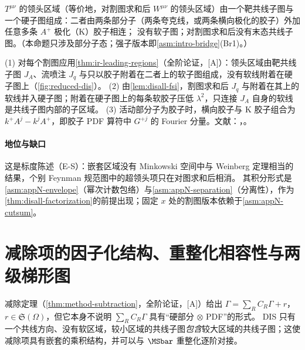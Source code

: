 \begin{proposition}\label{prop:disall-regions}
$T^{\mu\nu}$ 的领头区域（等价地，对割图求和后 $W^{\mu\nu}$ 的领头区域）由一个靶共线子图与一个硬子图组成：二者由两条部分子（两条夸克线，或两条横向极化的胶子）外加任意多条 $A^+$ 极化（K）胶子相连；
没有软子图；对割图求和后没有末态共线子图。（本命题只涉及部分子态；强子版本即\cref{asm:intro-bridge}(Br1)。）
\end{proposition}

\begin{proofsketch}
(1) 对每个割图应用\cref{thm:ir-leading-regions}（全阶论证，[A]）：领头区域由靶共线子图 $J_A$、流喷注 $J_q$ 与只以胶子附着在二者上的软子图组成，没有软线附着在硬子图上（\cref{fig:reduced-dis}）。
(2) 由\cref{lem:disall-fsi}，割图求和后 $J_q$ 与附着在其上的软线并入硬子图；附着在硬子图上的每条软胶子压低 $\lambda^2$，只连接 $J_A$ 自身的软线是共线子图内部的子区域。
(3) 活动部分子为胶子时，横向胶子与 K 胶子组合为 $k^+A^j-k^jA^+$，即胶子 PDF 算符中 $G^{+j}$ 的 Fourier 分量。文献：\cite{LibbySterman1978a}，\cite[第~8.7~节]{CollinsSoperSterman1989}。
\end{proofsketch}

\paragraph{地位与缺口}
这是标度陈述（E-S）：嵌套区域没有 Minkowski 空间中与 Weinberg 定理相当的结果，个别 Feynman 规范图中的超领头项只在对图求和后相消。
其积分形式是\cref{asm:appN-envelope}（幂次计数包络）与\cref{asm:appN-separation}（分离性），作为\cref{thm:disall-factorization}的前提出现；固定 $x$ 处的割图版本依赖于\cref{asm:appN-cutsum}。

\section{减除项的因子化结构、重整化相容性与两级梯形图}\label{sec:disall-subtraction}

减除定理（\cref{thm:method-subtraction}，全阶论证，[A]）给出 $\Gamma=\sum_RC_R\Gamma+r$，$r\in\mathfrak S(\Omega)$，但它本身不说明 $\sum_RC_R\Gamma$ 具有“硬部分 $\otimes$ PDF”的形式。
DIS 只有一个共线方向、没有软区域，较小区域的共线子图\emph{包含}较大区域的共线子图；这使减除项具有嵌套的乘积结构，并可以与 $\MSbar$ 重整化逐阶对接。

